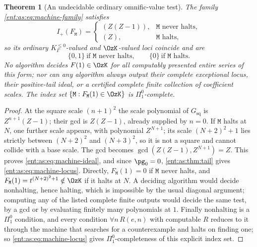 \documentclass[11pt]{article}
\newtheorem{theorem}{Theorem}[section]
\theoremstyle{plain}
\theoremstyle{plain}
\theoremstyle{plain}
\theoremstyle{definition}
\theoremstyle{definition}
\theoremstyle{definition}
\theoremstyle{definition}
\theoremstyle{remark}
\newcommand{\Kle}{K_\Gamma^{\le0}}\DeclareMathOperator{\Jac}{Jac}
\begin{document}
\begin{theorem}[An undecidable ordinary omnific-value test]
\label{ent:as:thm:undecidable}
The family \eqref{ent:as:eq:machine-family} satisfies
\begin{equation}\label{ent:as:eq:machine-ideal}
 I_+(F_{\mathtt M})=
 \begin{cases}(Z(Z-1)),&\mathtt M\text{ never halts},\\
 (Z),&\mathtt M\text{ halts},\end{cases}
\end{equation}
so its ordinary $\Kle$-valued and $\OzK$-valued loci coincide and are
\begin{equation}\label{ent:as:eq:machine-locus}
 \{0,1\}\ \text{if }\mathtt M\text{ never halts},\qquad
 \{0\}\ \text{if }\mathtt M\text{ halts}.
\end{equation}
No algorithm decides $F(1)\in\OzK$ for all computably presented entire series
of this form; nor can any algorithm always output their complete exceptional
locus, their positive-tail ideal, or a certified complete finite collection of
coefficient scales. The index set $\{\mathtt M:F_{\mathtt M}(1)\in\OzK\}$ is
$\Pi^0_1$-complete.
\end{theorem}
\begin{proof}
At the square scale $(n+1)^2$ the scale polynomial of $G_{\mathrm{sq}}$ is
$Z^{n+1}(Z-1)$; their gcd is $Z(Z-1)$, already supplied by $n=0$. If
$\mathtt M$ halts at $N$, one further scale appears, with polynomial $Z^{N+1}$;
its scale $(N+2)^2+1$ lies strictly between $(N+2)^2$ and $(N+3)^2$, so it is
not a square and cannot collide with a base scale. The gcd becomes
$\gcd(Z(Z-1),Z^{N+1})=Z$. This proves \eqref{ent:as:eq:machine-ideal}, and
since $\pg_0=0$, \cref{ent:as:thm:tail} gives \eqref{ent:as:eq:machine-locus}.
Directly, $F_{\mathtt M}(1)=0$ if $\mathtt M$ never halts, and
$F_{\mathtt M}(1)=t^{(N+2)^2+1}\notin\OzK$ if it halts at $N$. A deciding
algorithm would decide nonhalting, hence halting, which is impossible by the
usual diagonal argument; computing any of the listed complete finite outputs
would decide the same test, by a gcd or by evaluating finitely many
polynomials at $1$. Finally nonhalting is a $\Pi^0_1$ condition, and every
condition $\forall n\,R(e,n)$ with computable $R$ reduces to it through the
machine that searches for a counterexample and halts on finding one; so
\eqref{ent:as:eq:machine-locus} gives $\Pi^0_1$-completeness of this explicit
index set.
\end{proof}
\end{document}
